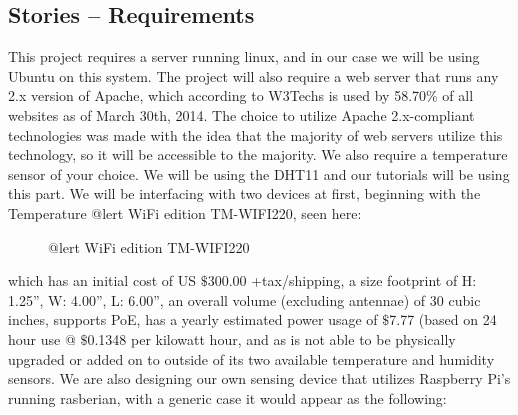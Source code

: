 \documentclass{report}
\begin{document}
\subsection*{Stories -- Requirements}
This project requires a server running linux, and in our case we will be using Ubuntu on this system. 
The project will also require a web server that runs any 2.x version of Apache, which according to W3Techs is used by 58.70$\%$ of all websites as of March 30th, 2014.
The choice to utilize Apache 2.x-compliant technologies was made with the idea that the majority of web servers utilize this technology, so it will be accessible to the majority. 
We also require a temperature sensor of your choice.
We will be using the DHT11 and our tutorials will be using this part. 
We will be interfacing with two devices at first, beginning with the Temperature @lert WiFi edition TM-WIFI220, seen here:
\begin{figure}[H]
\caption{@lert WiFi edition TM-WIFI220}
\end{figure}
 which has an initial cost of US $\$$300.00 +tax/shipping, a size footprint of H: 1.25”, W: 4.00”, L: 6.00”, an overall volume (excluding antennae) of 30 cubic inches, supports PoE, has a yearly estimated power usage of $\$$7.77 (based on 24 hour use @ $\$$0.1348 per kilowatt hour, and as is not able to be physically upgraded or added on to outside of its two available temperature and humidity sensors.
\newline
\indent
We are also designing our own sensing device that utilizes Raspberry Pi’s running rasberian, with a generic case it would appear as the following:
\end{document}
